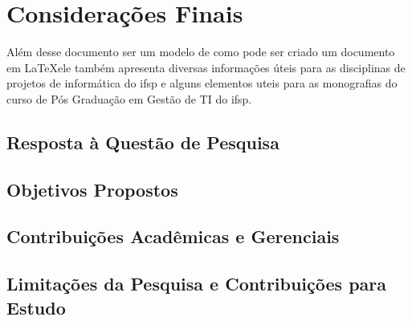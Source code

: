 \chapter*{Considerações Finais}


Além desse documento ser um modelo de como pode ser criado um documento em \LaTeX \space ele também apresenta diversas informações úteis para as disciplinas de projetos de informática do \ac{ifsp} e alguns elementos uteis para as monografias do curso de Pós Graduação em Gestão de TI do \ac{ifsp}.



\section{Resposta à Questão de Pesquisa}
\lipsum[3-5]

\section{Objetivos Propostos}
\lipsum[3-5]

\section{Contribuições Acadêmicas e Gerenciais}
\lipsum[3-5]

\section{Limitações da Pesquisa e Contribuições para Estudo}
\lipsum[3-5]
